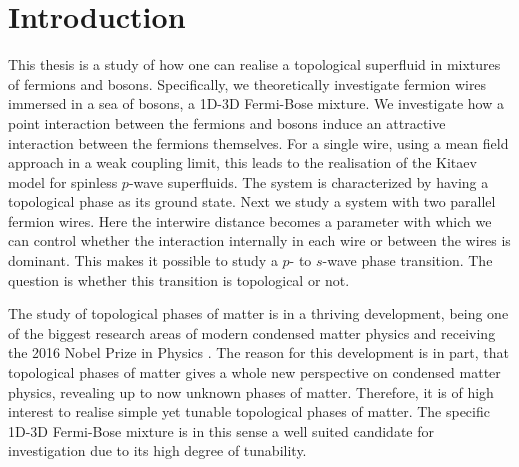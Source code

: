 
\chapter{Introduction} %

\label{Chapter1} %



This thesis is a study of how one can realise a topological superfluid in mixtures of fermions and bosons. Specifically, we theoretically investigate fermion wires immersed in a sea of bosons, a 1D-3D Fermi-Bose mixture. We investigate how a point interaction between the fermions and bosons induce an attractive interaction between the fermions themselves. For a single wire, using a mean field approach in a weak coupling limit, this leads to the realisation of the Kitaev model for spinless $p$-wave superfluids. The system is characterized by having a topological phase as its ground state. Next we study a system with two parallel fermion wires. Here the interwire distance becomes a parameter with which we can control whether the interaction internally in each wire or between the wires is dominant. This makes it possible to study a $p$- to $s$-wave phase transition. The question is whether this transition is topological or not. 

The study of topological phases of matter is in a thriving development, being one of the biggest research areas of modern condensed matter physics and receiving the 2016 Nobel Prize in Physics \cite{NobelPrize2016}. The reason for this development is in part, that topological phases of matter gives a whole new perspective on condensed matter physics, revealing up to now unknown phases of matter. Therefore, it is of high interest to realise simple yet tunable topological phases of matter. The specific 1D-3D Fermi-Bose mixture is in this sense a well suited candidate for investigation due to its high degree of tunability. 

